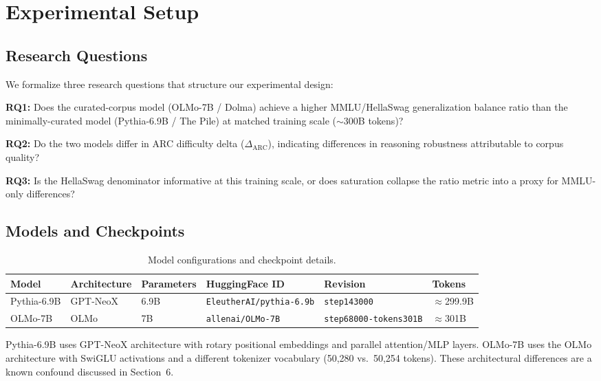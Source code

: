 \section{Experimental Setup}

\subsection{Research Questions}

We formalize three research questions that structure our experimental design:

\textbf{RQ1:} Does the curated-corpus model (OLMo-7B / Dolma) achieve a higher MMLU/HellaSwag generalization balance ratio than the minimally-curated model (Pythia-6.9B / The Pile) at matched training scale ($\sim$300B tokens)?

\textbf{RQ2:} Do the two models differ in ARC difficulty delta ($\Delta_{\text{ARC}}$), indicating differences in reasoning robustness attributable to corpus quality?

\textbf{RQ3:} Is the HellaSwag denominator informative at this training scale, or does saturation collapse the ratio metric into a proxy for MMLU-only differences?

\subsection{Models and Checkpoints}

\begin{table}[h]
\centering
\caption{Model configurations and checkpoint details.}
\begin{tabular}{llllll}
\toprule
Model & Architecture & Parameters & HuggingFace ID & Revision & Tokens \\
\midrule
Pythia-6.9B & GPT-NeoX & 6.9B & \texttt{EleutherAI/pythia-6.9b} & \texttt{step143000} & $\approx$299.9B \\
OLMo-7B & OLMo & 7B & \texttt{allenai/OLMo-7B} & \texttt{step68000-tokens301B} & $\approx$301B \\
\bottomrule
\end{tabular}
\end{table}

Pythia-6.9B uses GPT-NeoX architecture with rotary positional embeddings and parallel attention/MLP layers. OLMo-7B uses the OLMo architecture with SwiGLU activations and a different tokenizer vocabulary (50,280 vs.\ 50,254 tokens). These architectural differences are a known confound discussed in Section~6.

